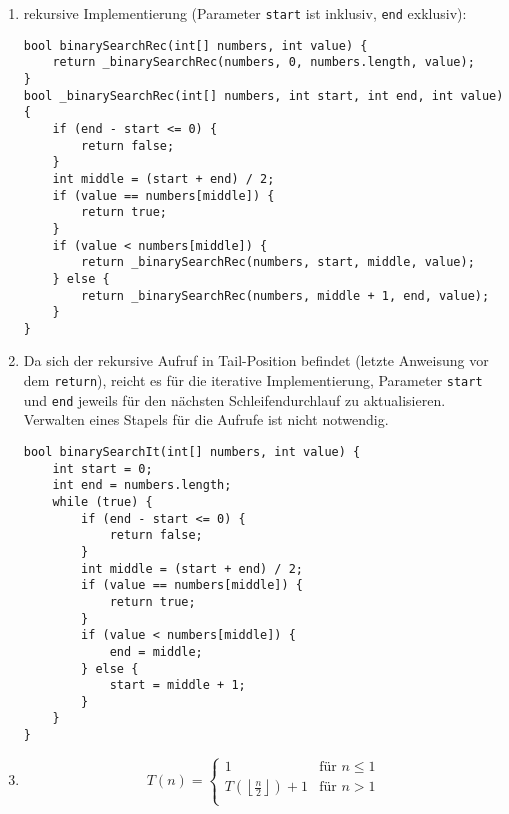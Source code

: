 \documentclass[11pt,a4paper]{article}
\begin{document}
\newpage
\begin{loesung}
\begin{enumerate}
    \item rekursive Implementierung (Parameter \texttt{start} ist inklusiv, \texttt{end} exklusiv):
    \begin{lstlisting}
bool binarySearchRec(int[] numbers, int value) {
    return _binarySearchRec(numbers, 0, numbers.length, value);
}
bool _binarySearchRec(int[] numbers, int start, int end, int value) {
    if (end - start <= 0) {
        return false;
    }
    int middle = (start + end) / 2;
    if (value == numbers[middle]) {
        return true;
    }
    if (value < numbers[middle]) {
        return _binarySearchRec(numbers, start, middle, value);
    } else {
        return _binarySearchRec(numbers, middle + 1, end, value);
    }
}
    \end{lstlisting}
    \item Da sich der rekursive Aufruf in Tail-Position befindet (letzte Anweisung vor dem \texttt{return}), reicht es für die iterative Implementierung, Parameter \texttt{start} und \texttt{end} jeweils für den nächsten Schleifendurchlauf zu aktualisieren.
    Verwalten eines Stapels für die Aufrufe ist nicht notwendig.
    \begin{lstlisting}
bool binarySearchIt(int[] numbers, int value) {
    int start = 0;
    int end = numbers.length;
    while (true) {
        if (end - start <= 0) {
            return false;
        }
        int middle = (start + end) / 2;
        if (value == numbers[middle]) {
            return true;
        }
        if (value < numbers[middle]) {
            end = middle;
        } else {
            start = middle + 1;
        }
    }
}
    \end{lstlisting}
    \item 
    \begin{equation}
        T(n) = \begin{cases}
            1 & \text{für $n \leq 1$} \\
            T(\left\lfloor \frac{n}{2} \right\rfloor) + 1  & \text{für $n > 1$} \\
        \end{cases}
    \end{equation}
\end{enumerate}

\end{loesung}
\end{document}

